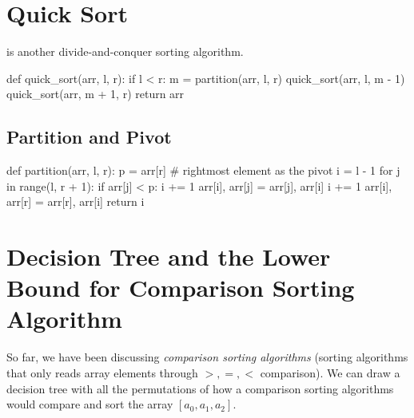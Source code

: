 \section{Quick Sort}

 is another divide-and-conquer sorting algorithm.

\begin{python}
def quick_sort(arr, l, r):
    if l < r:
        m = partition(arr, l, r)
        quick_sort(arr, l, m - 1)
        quick_sort(arr, m + 1, r)
    return arr
\end{python}

\subsection{Partition and Pivot}

\begin{python}
def partition(arr, l, r):
    p = arr[r]  # rightmost element as the pivot
    i = l - 1
    for j in range(l, r + 1):
        if arr[j] < p:
            i += 1
            arr[i], arr[j] = arr[j], arr[i]
    i += 1
    arr[i], arr[r] = arr[r], arr[i]
    return i
\end{python}

\section[Comparison Sorting Algo Lower Bound]{Decision Tree and the Lower Bound for Comparison Sorting Algorithm }

So far, we have been discussing \textit{comparison sorting algorithms} (sorting algorithms that only reads array elements through $>, =, <$ comparison). We can draw a decision tree with all the permutations of how a comparison sorting algorithms would compare and sort the array $[a_{0}, a_{1}, a_{2}]$.

\begin{center}
\end{center}

